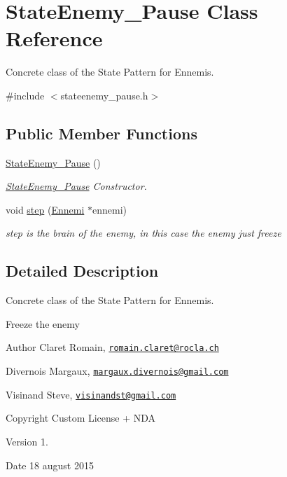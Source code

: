 \hypertarget{class_state_enemy___pause}{}\section{State\+Enemy\+\_\+\+Pause Class Reference}
\label{class_state_enemy___pause}


Concrete class of the State Pattern for Ennemis.  




{\ttfamily \#include $<$stateenemy\+\_\+pause.\+h$>$}

\subsection*{Public Member Functions}
\begin{DoxyCompactItemize}
\item 
\hypertarget{class_state_enemy___pause_a255ff4bef3595145a33896c0f0065ef4}{}\hyperlink{class_state_enemy___pause_a255ff4bef3595145a33896c0f0065ef4}{State\+Enemy\+\_\+\+Pause} ()\label{class_state_enemy___pause_a255ff4bef3595145a33896c0f0065ef4}

\begin{DoxyCompactList}\small\item\em \hyperlink{class_state_enemy___pause}{State\+Enemy\+\_\+\+Pause} Constructor. \end{DoxyCompactList}\item 
void \hyperlink{class_state_enemy___pause_a69ff2e92a26470974c9f7531ce3a6dda}{step} (\hyperlink{class_ennemi}{Ennemi} $\ast$ennemi)
\begin{DoxyCompactList}\small\item\em step is the brain of the enemy, in this case the enemy just freeze \end{DoxyCompactList}\end{DoxyCompactItemize}


\subsection{Detailed Description}
Concrete class of the State Pattern for Ennemis. 

Freeze the enemy \begin{DoxyAuthor}{Author}
Claret Romain, \href{mailto:romain.claret@rocla.ch}{\tt romain.\+claret@rocla.\+ch} 

Divernois Margaux, \href{mailto:margaux.divernois@gmail.com}{\tt margaux.\+divernois@gmail.\+com} 

Visinand Steve, \href{mailto:visinandst@gmail.com}{\tt visinandst@gmail.\+com} 
\end{DoxyAuthor}
\begin{DoxyCopyright}{Copyright}
Custom License + N\+D\+A 
\end{DoxyCopyright}
\begin{DoxyVersion}{Version}
1. 
\end{DoxyVersion}
\begin{DoxyDate}{Date}
18 august 2015 
\end{DoxyDate}


